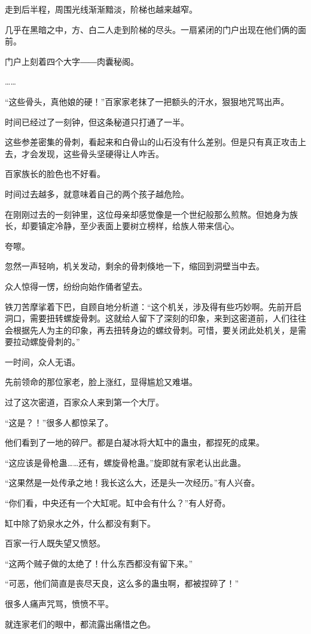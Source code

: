 \begin{this_body}
走到后半程，周围光线渐渐黯淡，阶梯也越来越窄。

几乎在黑暗之中，方、白二人走到阶梯的尽头。一扇紧闭的门户出现在他们俩的面前。

门户上刻着四个大字――肉囊秘阁。

……

“这些骨头，真他娘的硬！”百家家老抹了一把额头的汗水，狠狠地咒骂出声。

时间已经过了一刻钟，但这条秘道只打通了一半。

这些参差密集的骨刺，看起来和白骨山的山石没有什么差别。但是只有真正攻击上去，才会发现，这些骨头坚硬得让人咋舌。

百家族长的脸色也不好看。

时间过去越多，就意味着自己的两个孩子越危险。

在刚刚过去的一刻钟里，这位母亲却感觉像是一个世纪般那么煎熬。但她身为族长，却要镇定冷静，至少表面上要树立榜样，给族人带来信心。

夸嚓。

忽然一声轻响，机关发动，剩余的骨刺倏地一下，缩回到洞壁当中去。

众人惊得一愣，纷纷向始作俑者望去。

铁刀苦摩挲着下巴，自顾自地分析道：“这个机关，涉及得有些巧妙啊。先前开启洞口，需要扭转螺旋骨刺。这就给人留下了深刻的印象，来到这密道前，人们往往会根据先人为主的印象，再去扭转身边的螺纹骨刺。可惜，要关闭此处机关，是需要拉动螺旋骨刺的。”

一时间，众人无语。

先前领命的那位家老，脸上涨红，显得尴尬又难堪。

过了这次密道，百家众人来到第一个大厅。

“这是？！”很多人都惊呆了。

他们看到了一地的碎尸。都是白凝冰将大缸中的蛊虫，都捏死的成果。

“这应该是骨枪蛊……还有，螺旋骨枪蛊。”旋即就有家老认出此蛊。

“这果然是一处传承之地！我长这么大，还是头一次经历。”有人兴奋。

“你们看，中央还有一个大缸呢。缸中会有什么？”有人好奇。

缸中除了奶泉水之外，什么都没有剩下。

百家一行人既失望又愤怒。

“这两个贼子做的太绝了！什么东西都没有留下来。”

“可恶，他们简直是丧尽天良，这么多的蛊虫啊，都被捏碎了！”

很多人痛声咒骂，愤愤不平。

就连家老们的眼中，都流露出痛惜之色。


\end{this_body}
